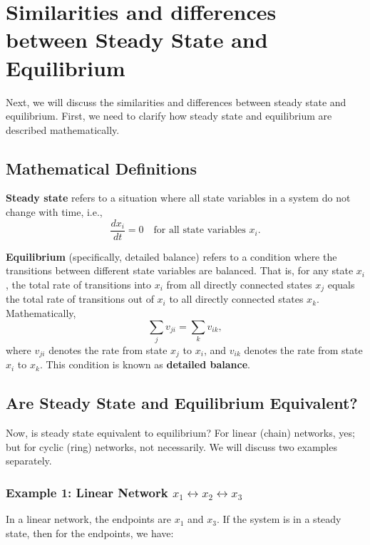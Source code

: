 \documentclass[12pt]{article}
\begin{document}
\section{Similarities and differences between Steady State and Equilibrium}

Next, we will discuss the similarities and differences between steady state and equilibrium. First, we need to clarify how steady state and equilibrium are described mathematically.

\subsection{Mathematical Definitions}

\textbf{Steady state} refers to a situation where all state variables in a system do not change with time, i.e.,
\begin{equation}
\frac{dx_i}{dt} = 0 \quad \text{for all state variables } x_i.
\end{equation}

\textbf{Equilibrium} (specifically, detailed balance) refers to a condition where the transitions between different state variables are balanced. That is, for any state \(x_i\), the total rate of transitions into \(x_i\) from all directly connected states \(x_j\) equals the total rate of transitions out of \(x_i\) to all directly connected states \(x_k\). Mathematically,
\begin{equation}
\sum_j v_{ji} = \sum_k v_{ik},
\end{equation}
where \(v_{ji}\) denotes the rate from state \(x_j\) to \(x_i\), and \(v_{ik}\) denotes the rate from state \(x_i\) to \(x_k\). This condition is known as \textbf{detailed balance}.

\subsection{Are Steady State and Equilibrium Equivalent?}

Now, is steady state equivalent to equilibrium? For linear (chain) networks, yes; but for cyclic (ring) networks, not necessarily. We will discuss two examples separately.

\subsubsection{Example 1: Linear Network \(x_1 \leftrightarrow x_2 \leftrightarrow x_3\)}

In a linear network, the endpoints are \(x_1\) and \(x_3\). If the system is in a steady state, then for the endpoints, we have:
\end{document}
